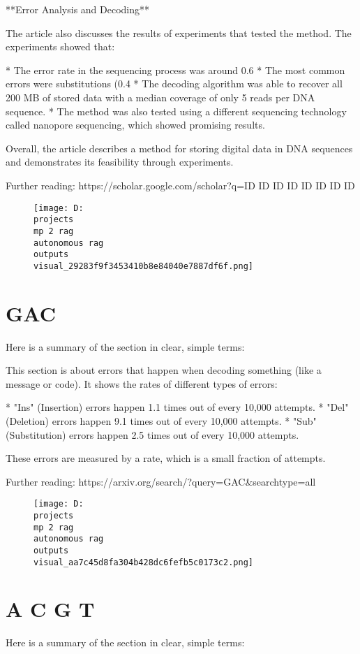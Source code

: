 \documentclass[12pt,a4paper]{article}
\begin{document}
**Error Analysis and Decoding**

The article also discusses the results of experiments that tested the method. The experiments showed that:

* The error rate in the sequencing process was around 0.6%
* The most common errors were substitutions (0.4%
* The decoding algorithm was able to recover all 200 MB of stored data with a median coverage of only 5 reads per DNA sequence.
* The method was also tested using a different sequencing technology called nanopore sequencing, which showed promising results.

Overall, the article describes a method for storing digital data in DNA sequences and demonstrates its feasibility through experiments.

Further reading: https://scholar.google.com/scholar?q=ID
ID
ID
ID
ID
ID
ID
ID
\begin{figure}[h]
\centering
\texttt{[image: D:\\projects\\mp 2 rag\\autonomous rag\\outputs\\visual\_29283f9f3453410b8e84040e7887df6f.png]}
\end{figure}
\section{GAC}
Here is a summary of the section in clear, simple terms:

This section is about errors that happen when decoding something (like a message or code). It shows the rates of different types of errors:

* "Ins" (Insertion) errors happen 1.1 times out of every 10,000 attempts.
* "Del" (Deletion) errors happen 9.1 times out of every 10,000 attempts.
* "Sub" (Substitution) errors happen 2.5 times out of every 10,000 attempts.

These errors are measured by a rate, which is a small fraction of attempts.

Further reading: https://arxiv.org/search/?query=GAC&searchtype=all
\begin{figure}[h]
\centering
\texttt{[image: D:\\projects\\mp 2 rag\\autonomous rag\\outputs\\visual\_aa7c45d8fa304b428dc6fefb5c0173c2.png]}
\end{figure}
\section{A
C
G
T}
Here is a summary of the section in clear, simple terms:
\end{document}
